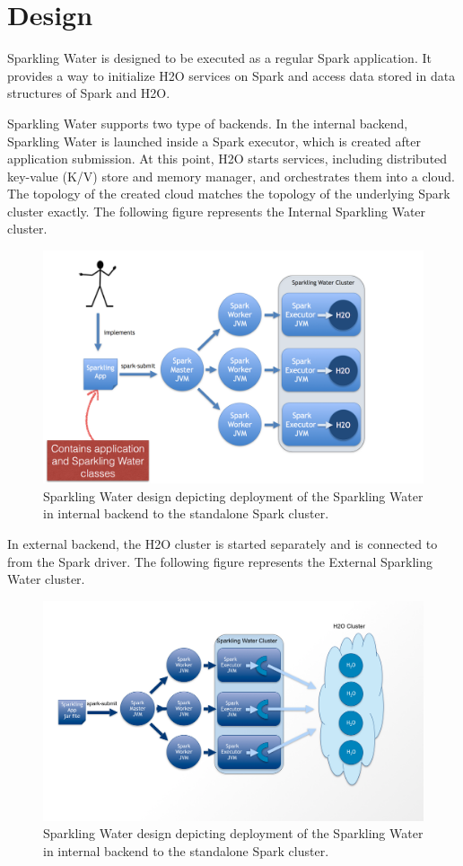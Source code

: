 \documentclass{standalone}
\begin{document}
\section{Design}
Sparkling Water is designed to be executed as a regular Spark application. It provides a way to initialize H2O services on Spark and access data stored in data structures of Spark and H2O.

Sparkling Water supports two type of backends. In the internal backend, Sparkling Water is launched inside
a Spark executor, which is created after application submission. At this point, H2O starts services,
including distributed key-value (K/V) store and memory manager, and orchestrates them into a cloud.
The topology of the created cloud matches the topology of the underlying Spark cluster exactly.
The following figure represents the Internal Sparkling Water cluster.


\begin{figure}[h!]
	\centering
	\includegraphics[scale=0.6]{sw/images/Topology-internal.png}
	\caption{Sparkling Water design depicting deployment of the Sparkling Water in internal backend to the standalone Spark cluster.}
\end{figure}

In external backend, the H2O cluster is started separately and is connected to from the Spark driver. The following figure represents the External Sparkling Water cluster.

\begin{figure}[h!]
	\centering
	\includegraphics[scale=0.4]{sw/images/Topology-external.png}
	\caption{Sparkling Water design depicting deployment of the Sparkling Water in internal backend to the standalone Spark cluster.}
\end{figure}
\end{document}
